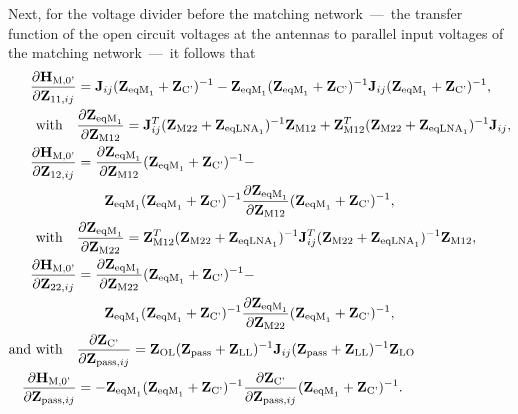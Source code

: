 Next, for the voltage divider before the matching network~---~the transfer function of the open circuit voltages at the antennas to parallel input voltages of the matching network~---~it follows that
\begin{align}
\label{eq:HM0_sig_grad}
\frac{\partial\mathbf{H}_\text{M,0'}}{\partial\mathbf{Z}_{11,ij}}&=
	\mathbf{J}_{ij}(\mathbf{Z}_{\text{eqM}_1} + \mathbf{Z}_\text{C'})^{-1} - 
	\mathbf{Z}_{\text{eqM}_1}(\mathbf{Z}_{\text{eqM}_1} + 
	\mathbf{Z}_\text{C'})^{-1}\mathbf{J}_{ij}(\mathbf{Z}_{\text{eqM}_1} + 
	\mathbf{Z}_\text{C'})^{-1},\\\nonumber
\text{with}\quad&\frac{\partial\mathbf{Z}_{\text{eqM}_1}}{\partial\mathbf{Z}_\text{M12}} = 
	\mathbf{J}_{ij}^T(\mathbf{Z}_\text{M22} + \mathbf{Z}_{\text{eqLNA}_1})^{-1}\mathbf{Z}_\text{M12} + 
	\mathbf{Z}_\text{M12}^T(\mathbf{Z}_\text{M22} + 
	\mathbf{Z}_{\text{eqLNA}_1})^{-1}\mathbf{J}_{ij}, \\\nonumber
\frac{\partial\mathbf{H}_\text{M,0'}}{\partial\mathbf{Z}_{12,ij}}&=
	\frac{\partial\mathbf{Z}_{\text{eqM}_1}}{\partial\mathbf{Z}_\text{M12}}
	(\mathbf{Z}_{\text{eqM}_1} + \mathbf{Z}_\text{C'})^{-1} -\\
&\qquad	\mathbf{Z}_{\text{eqM}_1}(\mathbf{Z}_{\text{eqM}_1} + \mathbf{Z}_\text{C'})^{-1}
	\frac{\partial\mathbf{Z}_{\text{eqM}_1}}{\partial\mathbf{Z}_\text{M12}}
	(\mathbf{Z}_{\text{eqM}_1} + \mathbf{Z}_\text{C'})^{-1},\\\nonumber
\text{with}\quad&\frac{\partial\mathbf{Z}_{\text{eqM}_1}}{\partial\mathbf{Z}_\text{M22}} = 
	\mathbf{Z}_\text{M12}^T(\mathbf{Z}_\text{M22} + \mathbf{Z}_{\text{eqLNA}_1})^{-1}
	\mathbf{J}_{ij}^T(\mathbf{Z}_\text{M22} +
	\mathbf{Z}_{\text{eqLNA}_1})^{-1}\mathbf{Z}_\text{M12},\\\nonumber
\frac{\partial\mathbf{H}_\text{M,0'}}{\partial\mathbf{Z}_{22,ij}}&=
	\frac{\partial\mathbf{Z}_{\text{eqM}_1}}{\partial\mathbf{Z}_\text{M22}}
	(\mathbf{Z}_{\text{eqM}_1} + \mathbf{Z}_\text{C'})^{-1} -\\
  &\qquad \mathbf{Z}_{\text{eqM}_1}(\mathbf{Z}_{\text{eqM}_1} + \mathbf{Z}_\text{C'})^{-1}
	\frac{\partial\mathbf{Z}_{\text{eqM}_1}}{\partial\mathbf{Z}_\text{M22}}
	(\mathbf{Z}_{\text{eqM}_1} + \mathbf{Z}_\text{C'})^{-1},\\\nonumber
\text{and with}\quad&\frac{\partial\mathbf{Z}_\text{C'}}{\partial\mathbf{Z}_{\text{pass},ij}} = 
	\mathbf{Z}_\text{OL}(\mathbf{Z}_{\text{pass}}+
	\mathbf{Z}_\text{LL})^{-1}\mathbf{J}_{ij}(\mathbf{Z}_{\text{pass}}+
	\mathbf{Z}_\text{LL})^{-1}\mathbf{Z}_\text{LO}\\
\frac{\partial\mathbf{H}_\text{M,0'}}{\partial\mathbf{Z}_{\text{pass},ij}}&=
	-\mathbf{Z}_{\text{eqM}_1}(\mathbf{Z}_{\text{eqM}_1} + \mathbf{Z}_\text{C'})^{-1}
	\frac{\partial\mathbf{Z}_\text{C'}}{\partial\mathbf{Z}_{\text{pass},ij}}
	(\mathbf{Z}_{\text{eqM}_1} + \mathbf{Z}_\text{C'})^{-1}.
\end{align}



